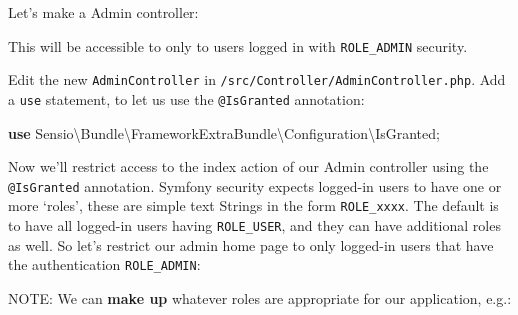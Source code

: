 \documentclass[a4paperpaper,openright]{book}
\newenvironment{Shaded}{}{}
\newcommand{\AnnotationTok}[1]{\textcolor[rgb]{0.38,0.63,0.69}{\textbf{\textit{#1}}}}
\newcommand{\CommentTok}[1]{\textcolor[rgb]{0.38,0.63,0.69}{\textit{#1}}}
\newcommand{\ExtensionTok}[1]{#1}
\newcommand{\KeywordTok}[1]{\textcolor[rgb]{0.00,0.44,0.13}{\textbf{#1}}}
\newcommand{\NormalTok}[1]{#1}
\newcommand{\OtherTok}[1]{\textcolor[rgb]{0.00,0.44,0.13}{#1}}
\newcommand{\StringTok}[1]{\textcolor[rgb]{0.25,0.44,0.63}{#1}}
\begin{document}
Let's make a Admin controller:

\begin{Shaded}
\end{Shaded}

This will be accessible to only to users logged in with
\texttt{ROLE\_ADMIN} security.

Edit the new \texttt{AdminController} in
\texttt{/src/Controller/AdminController.php}. Add a \texttt{use}
statement, to let us use the \texttt{@IsGranted} annotation:

\begin{Shaded}
\begin{Highlighting}[]
    \KeywordTok{use}\NormalTok{ Sensio\textbackslash{}Bundle\textbackslash{}FrameworkExtraBundle\textbackslash{}Configuration\textbackslash{}IsGranted}\OtherTok{;}
\end{Highlighting}
\end{Shaded}

Now we'll restrict access to the index action of our Admin controller
using the \texttt{@IsGranted} annotation. Symfony security expects
logged-in users to have one or more `roles', these are simple text
Strings in the form \texttt{ROLE\_xxxx}. The default is to have all
logged-in users having \texttt{ROLE\_USER}, and they can have additional
roles as well. So let's restrict our admin home page to only logged-in
users that have the authentication \texttt{ROLE\_ADMIN}:

\begin{Shaded}
\end{Shaded}

NOTE: We can \textbf{make up} whatever roles are appropriate for our
application, e.g.:
\end{document}
